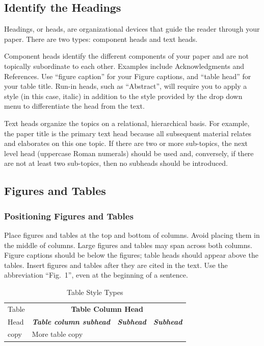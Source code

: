\documentclass[conference,flushend]{iaria-lite}
\begin{document}
\subsection{Identify the Headings}
Headings, or heads, are organizational devices that guide the reader through your paper. There are two types: component heads and text heads.

Component heads identify the different components of your paper and are not topically subordinate to each other. Examples include Acknowledgments and References. %
Use “figure caption” for your Figure captions, and “table head” for your table title. Run-in heads, such as “Abstract”, will require you to apply a style (in this case, italic) in addition to the style provided by the drop down menu to differentiate the head from the text.

Text heads organize the topics on a relational, hierarchical basis. For example, the paper title is the primary text head because all subsequent material relates and elaborates on this one topic. If there are two or more sub-topics, the next level head (uppercase Roman numerals) should be used and, conversely, if there are not at least two sub-topics, then no subheads should be introduced.

\subsection{Figures and Tables}

\subsubsection{Positioning Figures and Tables}
Place figures and tables at the top and bottom of columns. Avoid placing them in the middle of columns. Large figures and tables may span across both columns. Figure captions should be below the figures; table heads should appear above the tables. Insert figures and tables after they are cited in the text. Use the abbreviation “Fig.~1”, even at the beginning of a sentence.

\begin{table}[htbp]
\caption{Table Style Types}
\renewcommand{\arraystretch}{1.5} %
\begin{tabular}{|l|l|l|l|}
\hline
Table & \multicolumn{3}{c|}{\textbf{Table Column Head}} \\ \cline{2-4}
Head & \textbf{\emph{Table column subhead}}  & \textbf{\emph{Subhead}} & \textbf{\emph{Subhead}} \\ \hline
copy & More table copy & ~ & ~ \\ \hline
\end{tabular}
\end{table}
\end{document}
